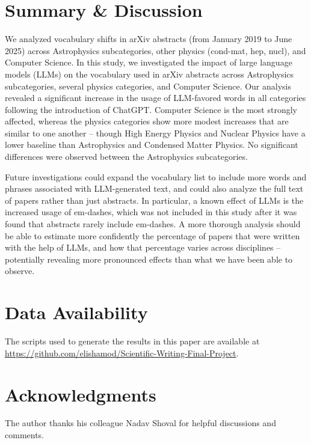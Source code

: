 \documentclass[twocolumn]{aastex701}
\begin{document}
\section{Summary \& Discussion}

We analyzed vocabulary shifts in arXiv abstracts (from January 2019 to June 2025) across Astrophysics subcategories, other physics (cond-mat, hep, nucl), and Computer Science.
In this study, we investigated the impact of large language models (LLMs) on the vocabulary used in arXiv abstracts across Astrophysics subcategories, several physics categories, and Computer Science.
Our analysis revealed a significant increase in the usage of LLM-favored words in all categories following the introduction of ChatGPT.
Computer Science is the most strongly affected, whereas the physics categories show more modest increases that are similar to one another -- though High Energy Physics and Nuclear Physics have a lower baseline than Astrophysics and Condensed Matter Physics.
No significant differences were observed between the Astrophysics subcategories.

Future investigations could expand the vocabulary list to include more words and phrases associated with LLM-generated text, and could also analyze the full text of papers rather than just abstracts.
In particular, a known effect of LLMs is the increased usage of em-dashes, which was not included in this study after it was found that abstracts rarely include em-dashes.
A more thorough analysis should be able to estimate more confidently the percentage of papers that were written with the help of LLMs, and how that percentage varies across disciplines -- potentially revealing more pronounced effects than what we have been able to observe.

\section*{Data Availability}
The scripts used to generate the results in this paper are available at \url{https://github.com/elishamod/Scientific-Writing-Final-Project}.

\section*{Acknowledgments}
The author thanks his colleague Nadav Shoval for helpful discussions and comments.

{}


\appendix 
\renewcommand{\thesection}{\Alph{section}}
\renewcommand{\thefigure}{\Alph{section}\arabic{figure}}
\renewcommand{\thetable}{\Alph{section}\arabic{table}}
\end{document}
